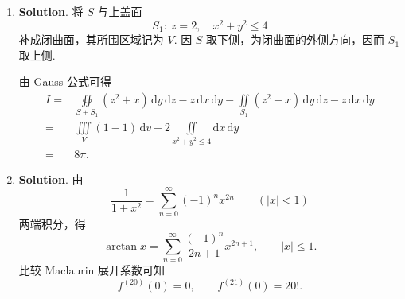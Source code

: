 \documentclass[../main.tex]{subfiles}
\begin{document}
\begin{enumerate}
    \item \textbf{Solution}. 将 \(S\) 与上盖面
          \[
              S_1:\ z=2,\quad x^2+y^2\le 4
          \]
          补成闭曲面，其所围区域记为 \(V\). 因 \(S\) 取下侧，为闭曲面的外侧方向，因而 \(S_1\) 取上侧.

          由 Gauss 公式可得
          \[
              \begin{aligned}
                  I = {} & \oiint\limits_{S+S_1} \left(z^2+x\right)\,\mathrm{d}y\,\mathrm{d}z - z\,\mathrm{d}x\,\mathrm{d}y
                  - \iint\limits_{S_1} \left(z^2+x\right)\,\mathrm{d}y\,\mathrm{d}z - z\,\mathrm{d}x\,\mathrm{d}y               \\
                  = {}   & \iiint\limits_V \left(1-1\right)\,\mathrm{d}v + 2\iint\limits_{x^2+y^2\le 4}\mathrm{d}x\,\mathrm{d}y \\
                  = {}   & 8\pi.
              \end{aligned}
          \]

    \item \textbf{Solution}. 由
          \[
              \frac{1}{1+x^2}=\sum_{n=0}^{\infty}(-1)^n x^{2n}\qquad (|x|<1)
          \]
          两端积分，得
          \[
              \arctan x=\sum_{n=0}^{\infty}\frac{(-1)^n}{2n+1}x^{2n+1},\qquad |x|\le 1.
          \]
          比较 Maclaurin 展开系数可知
          \[
              f^{(20)}(0)=0,\qquad f^{(21)}(0)=20!.
          \]

\end{enumerate}
\end{document}
